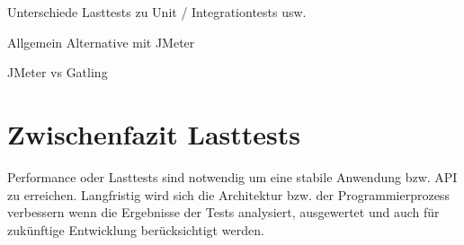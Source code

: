 Unterschiede Lasttests zu Unit / Integrationtests usw.



Allgemein Alternative mit JMeter

JMeter vs Gatling


\section{Zwischenfazit Lasttests}

Performance oder Lasttests sind notwendig um eine stabile Anwendung bzw. API zu erreichen.
Langfristig wird sich die Architektur bzw. der Programmierprozess verbessern wenn die Ergebnisse der Tests analysiert, ausgewertet und auch für zukünftige Entwicklung berücksichtigt werden.


